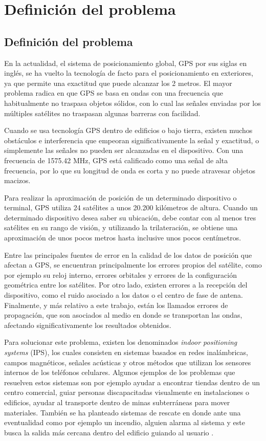
\chapter{Definición del problema}

\section{Definición del problema}

En la actualidad, el sistema de posicionamiento global, GPS por sus siglas en inglés, se ha vuelto la tecnología de facto para el posicionamiento en exteriores, ya que permite una exactitud que puede alcanzar los 2 metros. El mayor problema radica en que GPS se basa en ondas con una frecuencia que habitualmente no traspasa objetos sólidos, con lo cual las señales enviadas por los múltiples satélites no traspasan algunas barreras con facilidad.

Cuando se usa tecnología GPS dentro de edificios o bajo tierra, existen muchos obstáculos e interferencia que empeoran significativamente la señal y exactitud, o simplemente las señales no pueden ser alcanzadas en el dispositivo. Con una frecuencia de 1575.42 MHz, GPS está calificado como una señal de alta frecuencia, por lo que su longitud de onda es corta y no puede atravesar objetos macizos. 

Para realizar la aproximación de posición de un determinado dispositivo o terminal, GPS utiliza 24 satélites a unos 20.200 kilómetros de altura. Cuando un determinado dispositivo desea saber su ubicación, debe contar con al menos tres satélites en su rango de visión, y utilizando la trilateración, se obtiene una aproximación de unos pocos metros hasta inclusive unos pocos centímetros.

Entre las principales fuentes de error en la calidad de los datos de posición que afectan a GPS, se encuentran principalmente los errores propios del satélite, como por ejemplo su reloj interno, errores orbitales y errores de la configuración geométrica entre los satélites. Por otro lado, existen errores a la recepción del dispositivo, como el ruido asociado a los datos o el centro de fase de antena. Finalmente, y más relativo a este trabajo, están los llamados errores de propagación, que son asociados al medio en donde se transportan las ondas, afectando significativamente los resultados obtenidos.

Para solucionar este problema, existen los denominados \textit{indoor positioning systems} (IPS), los cuales consisten en sistemas basados en redes inalámbricas, campos magnéticos, señales acústicas y otros métodos que utilizan los sensores internos de los teléfonos celulares. Algunos ejemplos de los problemas que resuelven estos sistemas son por ejemplo ayudar a encontrar tiendas dentro de un centro comercial, guiar personas discapacitadas visualmente en instalaciones o edificios, ayudar al transporte dentro de minas subterráneas para mover materiales. También se ha planteado sistemas de rescate en donde ante una eventualidad como por ejemplo un incendio, alguien alarma al sistema y este busca la salida más cercana dentro del edificio guiando al usuario \citep{5647401}.

